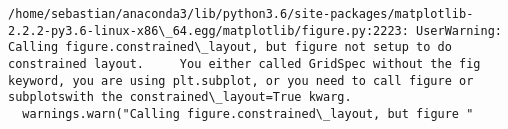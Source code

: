 \documentclass[11pt]{article}
\begin{document}
    \begin{Verbatim}[commandchars=\\\{\}]
/home/sebastian/anaconda3/lib/python3.6/site-packages/matplotlib-2.2.2-py3.6-linux-x86\_64.egg/matplotlib/figure.py:2223: UserWarning: Calling figure.constrained\_layout, but figure not setup to do constrained layout.     You either called GridSpec without the fig keyword, you are using plt.subplot, or you need to call figure or subplotswith the constrained\_layout=True kwarg.
  warnings.warn("Calling figure.constrained\_layout, but figure "

    \end{Verbatim}

    \begin{center}
    \end{center}
    { \hspace*{\fill} \\}
    

    
    
    
    
\end{document}
